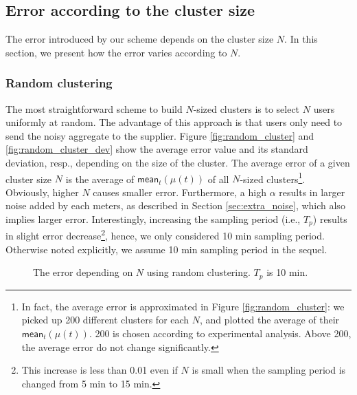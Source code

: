 \documentclass[11pt,a4paper]{article}
\theoremstyle{plain}
\theoremstyle{plain}
\theoremstyle{plain}
\theoremstyle{plain}
\theoremstyle{nonumberplain} \theoremseparator{}
\begin{document}
\subsection{Error according to the cluster size}  
    
The error introduced by our scheme depends on the cluster size $N$. In this section, we present how the error varies according to $N$.  

\subsubsection{Random clustering}

The most straightforward scheme to build $N$-sized clusters is to select $N$ users uniformly at random. The advantage of this approach is that users only need to send the noisy aggregate to the supplier. 
Figure \ref{fig:random_cluster} and \ref{fig:random_cluster_dev} show the average error value and its standard deviation, resp., depending on the size of the cluster. 
The average error of a given cluster size $N$ is the average of $\mathsf{mean}_{t}(\mu(t))$ of all 
$N$-sized clusters\footnote{In fact, the average error is approximated in Figure \ref{fig:random_cluster}:
we picked up 200 different clusters for each $N$, and plotted the average of their $\mathsf{mean}_{t}(\mu(t))$. 200 is chosen according to experimental analysis. Above 200, the average error do not change significantly.}. 
Obviously, higher $N$ causes smaller error. Furthermore, a high $\alpha$ results in larger noise added by each meters, as described in Section \ref{sec:extra_noise}, which also implies larger error.
Interestingly, increasing the sampling period (i.e., $T_p$) results in slight error decrease\footnote{This increase is less than 0.01 even if $N$ is small when the sampling period is changed from 5 min to 15 min.}, hence, we only considered 10 min sampling period. Otherwise noted explicitly, we assume 10 min sampling period in the sequel. 

\begin{figure*}[ht]
\centering
{}
\caption{\label{fig:random_cluster_main} The error depending on $N$ using random clustering. $T_{p}$ is 10 min.}

\end{figure*}
\end{document}
